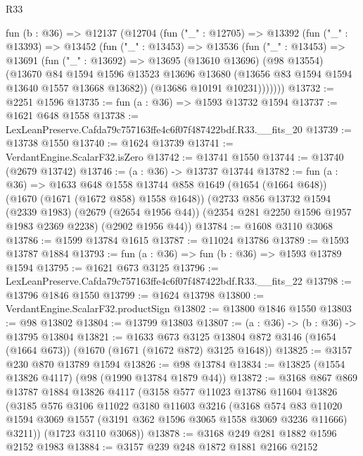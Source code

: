 \begin{lexlean}{R33}
\begin{coremodule}
  fun (b : @36) =>
  @12137
    (@12704
      (fun ("_" : @12705) =>
      @13392
        (fun ("_" : @13393) =>
        @13452
          (fun ("_" : @13453) =>
          @13536
            (fun ("_" : @13453) =>
            @13691
              (fun ("_" : @13692) =>
              @13695
                (@13610 @13696)
                (@98 @13554)
                (@13670
                  @84
                  @1594
                  @1596
                  @13523
                  @13696
                  @13680
                  (@13656 @83 @1594 @1594 @13640 @1557 @13668 @13682))
                (@13686 @10191 @10231)))))))
@13732 := @2251 @1596
@13735 := fun (a : @36) => @1593 @13732 @1594
@13737 := @1621 @648 @1558
@13738 := LexLeanPreserve.Cafda79c757163ffe4c6f07f487422bdf.R33.__fits_20
@13739 := @13738 @1550
@13740 := @1624 @13739
@13741 := VerdantEngine.ScalarF32.isZero
@13742 := @13741 @1550
@13744 := @13740 (@2679 @13742)
@13746 := (a : @36) -> @13737 @13744
@13782 := fun (a : @36) =>
  @1633
    @648
    @1558
    @13744
    @858
    @1649
    (@1654 (@1664 @648))
    (@1670 (@1671 (@1672 @858) @1558 @1648))
    (@2733
      @856
      @13732
      @1594
      (@2339 @1983)
      (@2679 (@2654 @1956 @44))
      (@2354 @281 @2250 @1596 @1957 @1983 @2369 @2238)
      (@2902 @1956 @44))
@13784 := @1608 @3110 @3068
@13786 := @1599 @13784 @1615
@13787 := @11024 @13786
@13789 := @1593 @13787 @1884
@13793 := fun (a : @36) => fun (b : @36) => @1593 @13789 @1594
@13795 := @1621 @673 @3125
@13796 := LexLeanPreserve.Cafda79c757163ffe4c6f07f487422bdf.R33.__fits_22
@13798 := @13796 @1846 @1550
@13799 := @1624 @13798
@13800 := VerdantEngine.ScalarF32.productSign
@13802 := @13800 @1846 @1550
@13803 := @98 @13802
@13804 := @13799 @13803
@13807 := (a : @36) -> (b : @36) -> @13795 @13804
@13821 := @1633
    @673
    @3125
    @13804
    @872
    @3146
    (@1654 (@1664 @673))
    (@1670 (@1671 (@1672 @872) @3125 @1648))
@13825 := @3157 @230 @870 @13789 @1594
@13826 := @98 @13784
@13834 := @13825 (@1554 @13826 @4117) (@98 (@1990 @13784 @1879 @44))
@13872 := @3168
    @867
    @869
    @13787
    @1884
    @13826
    @4117
    (@3158
      @577
      @11023
      @13786
      @11604
      @13826
      (@3185
        @576
        @3106
        @11022
        @3180
        @11603
        @3216
        (@3168
          @574
          @83
          @11020
          @1594
          @3069
          @1557
          (@3191 @362 @1596 @3065 @1558 @3069 @3236 @11666)
          @3211))
      (@1723 @3110 @3068))
@13878 := @3168 @249 @281 @1882 @1596 @2152 @1983
@13884 := @3157 @239 @248 @1872 @1881 @2166 @2152

\end{coremodule}
\end{lexlean}
